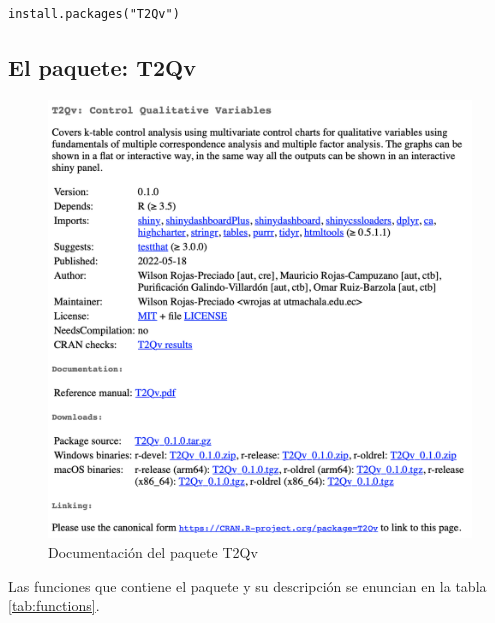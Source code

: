 \documentclass[mathematics,article,submit,moreauthors,pdftex]{mdpi}
\begin{document}
\begin{verbatim}
install.packages("T2Qv")
\end{verbatim}

\hypertarget{el-paquete-t2qv}{%
\subsection{El paquete: T2Qv}\label{el-paquete-t2qv}}

\begin{figure}[!ht]



\begin{center}\includegraphics[width=0.6\linewidth,]{DescrPack} \end{center}

\caption{Documentación del paquete T2Qv}

\label{fig:documentation}
\end{figure}

Las funciones que contiene el paquete y su descripción se enuncian en la
tabla \ref{tab:functions}.
\end{document}
